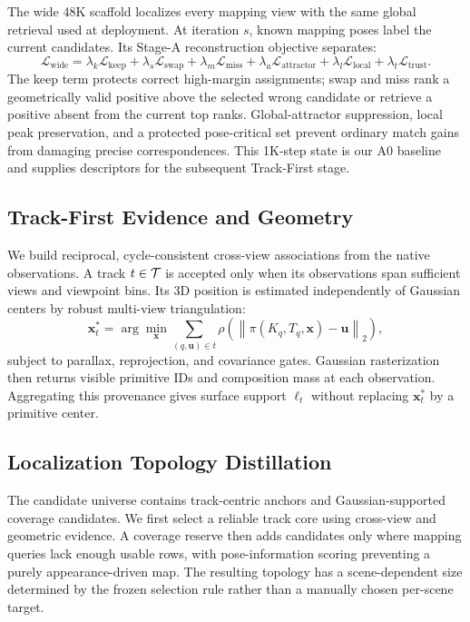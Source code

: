 The wide 48K scaffold localizes every mapping view with the same global
retrieval used at deployment. At iteration $s$, known mapping poses label the
current candidates. Its Stage-A reconstruction objective separates:
\begin{equation}
  \mathcal{L}_{\mathrm{wide}} =
  \lambda_k\mathcal{L}_{\mathrm{keep}}+
  \lambda_s\mathcal{L}_{\mathrm{swap}}+
  \lambda_m\mathcal{L}_{\mathrm{miss}}+
  \lambda_a\mathcal{L}_{\mathrm{attractor}}+
  \lambda_l\mathcal{L}_{\mathrm{local}}+
  \lambda_t\mathcal{L}_{\mathrm{trust}}.
\end{equation}
The keep term protects correct high-margin assignments; swap and miss rank a
geometrically valid positive above the selected wrong candidate or retrieve a
positive absent from the current top ranks. Global-attractor suppression,
local peak preservation, and a protected pose-critical set prevent ordinary
match gains from damaging precise correspondences. This 1K-step state is our
A0 baseline and supplies descriptors for the subsequent Track-First stage.

\subsection{Track-First Evidence and Geometry}

We build reciprocal, cycle-consistent cross-view associations from the native
observations. A track $t\in\mathcal{T}$ is accepted only when its observations span
sufficient views and viewpoint bins. Its 3D position is estimated independently
of Gaussian centers by robust multi-view triangulation:
\begin{equation}
  \mathbf{x}_t^*=
  \arg\min_{\mathbf{x}}\sum_{(q,\mathbf{u})\in t}
  \rho\!\left(\left\|\pi(K_q,T_q,\mathbf{x})-\mathbf{u}\right\|_2\right),
\end{equation}
subject to parallax, reprojection, and covariance gates. Gaussian rasterization
then returns visible primitive IDs and composition mass at each observation.
Aggregating this provenance gives surface support $\ell_t$ without replacing
$\mathbf{x}_t^*$ by a primitive center.

\subsection{Localization Topology Distillation}

The candidate universe contains track-centric anchors and Gaussian-supported
coverage candidates. We first select a reliable track core using cross-view and
geometric evidence. A coverage reserve then adds candidates only where mapping
queries lack enough usable rows, with pose-information scoring preventing a
purely appearance-driven map. The resulting topology has a scene-dependent
size determined by the frozen selection rule rather than a manually chosen
per-scene target.

